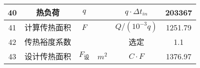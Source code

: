 \begin{table}[H]
{\begin{tabular}{|c|c|c|c|c|c|}
            40   & 热负荷           & $ q $               &           & $ q \cdot \Delta t_{in}$                                                                           & 203367           \\ \hline
            41   & 计算传热面积     & $ F $               &           & $ Q/(10^{-3}q) $                                                                                   & 1251.79          \\ \hline
            42   & 传热裕度系数     &                     &           & 选定                                                                                               & 1.1              \\ \hline
            43   & 设计传热面积     & $ F_{\text{设}} $   & $ m^2 $   & $ C \cdot F $                                                                                      & 1376.97          \\ \hline
        \end{tabular}
    }
\end{table}

